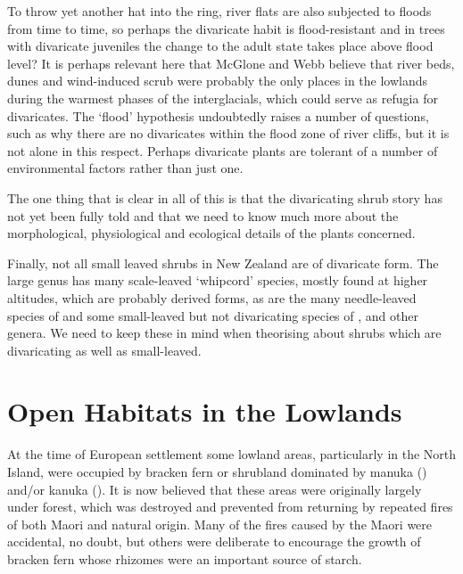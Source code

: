 To throw yet another hat into the ring, river flats are also subjected to floods from time to time, so perhaps the divaricate habit is flood-resistant and in trees with divaricate juveniles the change to the adult state takes place above flood level? It is perhaps relevant here that McGlone and Webb believe that river beds, dunes and wind-induced scrub were probably the only places in the lowlands during the warmest phases of the interglacials, which could serve as refugia for divaricates.
The `flood' hypothesis undoubtedly raises a number of questions, such as why there are no divaricates within the flood zone of river cliffs, but it is not alone in this respect.
Perhaps divaricate plants are tolerant of a number of environmental factors rather than just one.

The one thing that is clear in all of this is that the divaricating shrub story has not yet been fully told and that we need to know much more about the morphological, physiological and ecological details of the plants concerned.

Finally, not all small leaved shrubs in New Zealand are of divaricate form.
The large genus  has many scale-leaved `whipcord' species, mostly found at higher altitudes, which are probably derived forms, as are the many needle-leaved species of  and some small-leaved but not divaricating species of ,  and other genera.
We need to keep these in mind when theorising about shrubs which are divaricating as well as small-leaved.

\chapter{Open Habitats in the Lowlands}%
\label{ch:openhabitats}

At the time of European settlement some lowland areas, particularly in the North Island, were occupied by bracken fern or shrubland dominated by manuka () and/or kanuka ().
It is now believed that these areas were originally largely under forest, which was destroyed and prevented from returning by repeated fires of both Maori and natural origin.
Many of the fires caused by the Maori were accidental, no doubt, but others were deliberate to encourage the growth of bracken fern whose rhizomes were an important source of starch.

